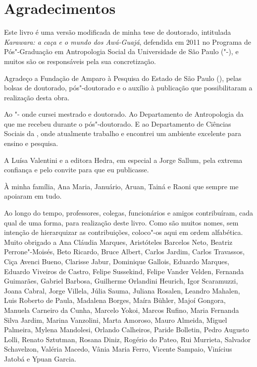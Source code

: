 \chapter*{Agradecimentos}


\noindent Este livro é uma versão modificada de minha tese de doutorado,
intitulada \emph{Karawara: a caça e o mundo dos Awá-Guajá}, defendida em
2011 no Programa de Pós"-Graduação em Antropologia Social da Universidade
de São Paulo ("-), e muitos são os responsáveis pela sua
concretização.

Agradeço a Fundação de Amparo à Pesquisa do Estado de São Paulo
(), pelas bolsas de doutorado, pós"-doutorado e o auxílio à
publicação que possibilitaram a realização desta obra.

Ao "- onde cursei mestrado e doutorado. Ao Departamento de
Antropologia da  que me recebeu durante o pós"-doutorado. E ao
Departamento de Ciências Sociais da , onde atualmente trabalho e
encontrei um ambiente excelente para ensino e pesquisa.

A Luísa Valentini e a editora Hedra, em especial a Jorge Sallum, pela
extrema confiança e pelo convite para que eu publicasse.

À minha família, Ana Maria, Januário, Aruan, Tainá e Raoni que sempre me
apoiaram em tudo.

Ao longo do tempo, professores, colegas, funcionários e amigos
contribuíram, cada qual de uma forma, para realização deste livro. Como
são muitos nomes, sem intenção de hierarquizar as contribuições,
coloco"-os aqui em ordem alfabética. Muito obrigado a Ana Cláudia
Marques, Aristóteles Barcelos Neto, Beatriz Perrone"-Moisés, Beto
Ricardo, Bruce Albert, Carlos Jardim, Carlos Travassos, Ciça Avenci
Bueno, Clarisse Jabur, Dominique Gallois, Eduardo Marques, Eduardo Viveiros de Castro,
Felipe Sussekind, Felipe Vander Velden, Fernanda Guimarães, Gabriel Barbosa, Guilherme
Orlandini Heurich, Igor Scaramuzzi, Joana Cabral, Jorge Villela, Júlia
Sauma, Juliana Rosalen, Leandro Mahalen, Luis Roberto de Paula, Madalena
Borges, Maíra Bühler, Majoí Gongora, Manuela Carneiro da Cunha, Marcelo
Yokoi, Marcos Rufino, Maria Fernanda Silva Jardim, Marina Vanzolini,
Marta Amoroso, Mauro Almeida, Miguel Palmeira, Mylena Mandolesi, Orlando Calheiros, Paride
Bolletin, Pedro Augusto Lolli, Renato Sztutman, Rosana Diniz, Rogério do
Pateo, Rui Murrieta, Salvador Schavelzon, Valéria Macedo, Vânia Maria Ferro, Vicente
Sampaio, Vinícius Jatobá e Ypuan Garcia.

